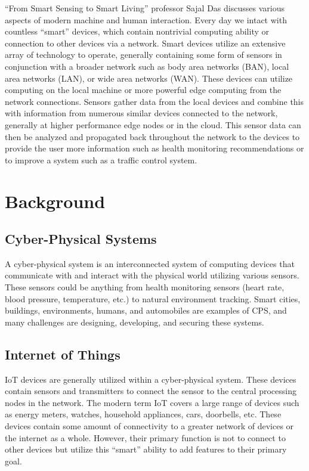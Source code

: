 \documentclass[journal,onecolumn]{IEEEtran}
\begin{document}
 ``From Smart Sensing to Smart Living'' professor Sajal Das discusses various aspects of modern machine and human interaction. 
Every day we intact with countless ``smart'' devices, which contain nontrivial computing ability or connection to other devices via a network. 
Smart devices utilize an extensive array of technology to operate, generally containing some form of sensors in conjunction with a broader network such as body area networks (BAN), local area networks (LAN), or wide area networks (WAN). 
These devices can utilize computing on the local machine or more powerful edge computing from the network connections. 
Sensors gather data from the local devices and combine this with information from numerous similar devices connected to the network, generally at higher performance edge nodes or in the cloud. 
This sensor data can then be analyzed and propagated back throughout the network to the devices to provide the user more information such as health monitoring recommendations or to improve a system such as a traffic control system.

\section{Background}

\subsection{Cyber-Physical Systems}

A cyber-physical system is an interconnected system of computing devices that communicate with and interact with the physical world utilizing various sensors. 
These sensors could be anything from health monitoring sensors (heart rate, blood pressure, temperature, etc.) to natural environment tracking. 
Smart cities, buildings, environments, humans, and automobiles are examples of CPS, and many challenges are designing, developing, and securing these systems. 

\subsection{Internet of Things}

IoT devices are generally utilized within a cyber-physical system. These devices contain sensors and transmitters to connect the sensor to the central processing nodes in the network. 
The modern term IoT covers a large range of devices such as energy meters, watches, household appliances, cars, doorbells, etc. These devices contain some amount of connectivity to a greater network of devices or the internet as a whole. However, their primary function is not to connect to other devices but utilize this ``smart'' ability to add features to their primary goal. 
\end{document}
